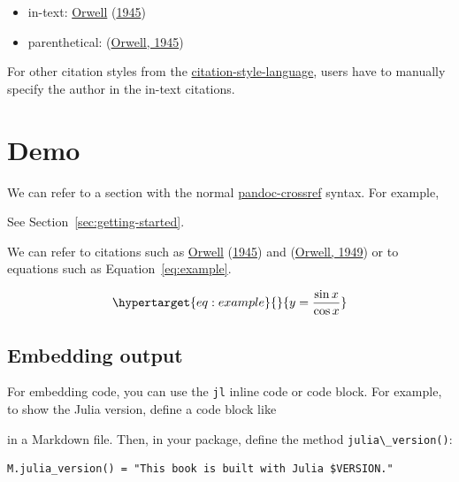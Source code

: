 \documentclass[
  14pt
  american,
  paper=a4,
  ,captions=tableheading
]{scrreprt}
\newcommand{\passthrough}[1]{#1}
\providecommand{\tightlist}{%
  \setlength{\itemsep}{0pt}\setlength{\parskip}{0pt}}
\renewenvironment{quote}{\begin{customblockquote}\list{}{\rightmargin=0em\leftmargin=0em}%
\item\relax\color{blockquote-text}\ignorespaces}{\unskip\unskip\endlist\end{customblockquote}}
\begin{document}
\begin{itemize}
\tightlist
\item
  in-text: \protect\hyperlink{ref-orwell1945animal}{Orwell}
  (\protect\hyperlink{ref-orwell1945animal}{1945})
\item
  parenthetical: (\protect\hyperlink{ref-orwell1945animal}{Orwell,
  1945})
\end{itemize}

For other citation styles from the
\href{https://github.com/citation-style-language/styles}{citation-style-language},
users have to manually specify the author in the in-text citations.

\hypertarget{sec:demo}{%
\chapter{Demo}\label{sec:demo}}

We can refer to a section with the normal
\href{https://lierdakil.github.io/pandoc-crossref/}{pandoc-crossref}
syntax. For example,

\begin{quote}
See Section~\ref{sec:getting-started}.
\end{quote}

We can refer to citations such as
\protect\hyperlink{ref-orwell1945animal}{Orwell}
(\protect\hyperlink{ref-orwell1945animal}{1945}) and
(\protect\hyperlink{ref-orwell1949nineteen}{Orwell, 1949}) or to
equations such as Equation~\ref{eq:example}.

\begin{equation}\protect\hypertarget{eq:example}{}{ y = \frac{\sin{x}}{\cos{x}} }\label{eq:example}\end{equation}

\hypertarget{sec:embedding-output}{%
\section{Embedding output}\label{sec:embedding-output}}

For embedding code, you can use the \passthrough{\lstinline!jl!} inline
code or code block. For example, to show the Julia version, define a
code block like

in a Markdown file. Then, in your package, define the method
\passthrough{\lstinline!julia\_version()!}:

\begin{lstlisting}
M.julia_version() = "This book is built with Julia $VERSION."
\end{lstlisting}
\end{document}
